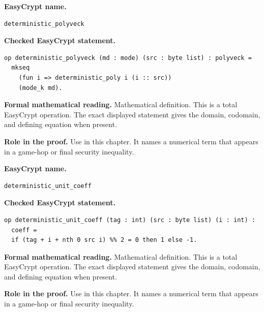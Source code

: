 \begin{formaldefinition}
\noindent\textbf{EasyCrypt name.}
\begin{lstlisting}[language=EasyCrypt,basicstyle=\ttfamily\scriptsize]
deterministic_polyveck
\end{lstlisting}
\noindent\textbf{Checked EasyCrypt statement.}
\begin{lstlisting}[language=EasyCrypt,basicstyle=\ttfamily\scriptsize]
op deterministic_polyveck (md : mode) (src : byte list) : polyveck =
  mkseq
    (fun i => deterministic_poly i (i :: src))
    (mode_k md).
\end{lstlisting}
\noindent\textbf{Formal mathematical reading.}
Mathematical definition. This is a total EasyCrypt operation.  The exact displayed statement gives the domain, codomain, and defining equation when present.

\noindent\textbf{Role in the proof.}
Use in this chapter. It names a numerical term that appears in a game-hop or final security inequality.

\end{formaldefinition}

\begin{formaldefinition}
\noindent\textbf{EasyCrypt name.}
\begin{lstlisting}[language=EasyCrypt,basicstyle=\ttfamily\scriptsize]
deterministic_unit_coeff
\end{lstlisting}
\noindent\textbf{Checked EasyCrypt statement.}
\begin{lstlisting}[language=EasyCrypt,basicstyle=\ttfamily\scriptsize]
op deterministic_unit_coeff (tag : int) (src : byte list) (i : int) :
  coeff =
  if (tag + i + nth 0 src i) %% 2 = 0 then 1 else -1.
\end{lstlisting}
\noindent\textbf{Formal mathematical reading.}
Mathematical definition. This is a total EasyCrypt operation.  The exact displayed statement gives the domain, codomain, and defining equation when present.

\noindent\textbf{Role in the proof.}
Use in this chapter. It names a numerical term that appears in a game-hop or final security inequality.

\end{formaldefinition}

